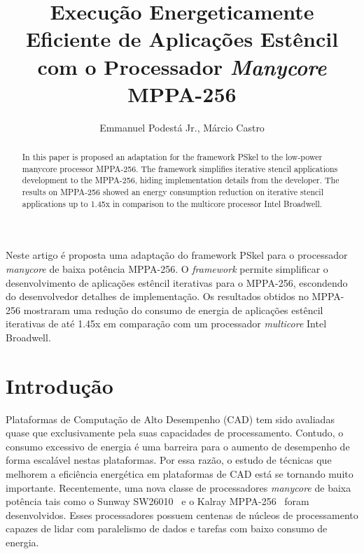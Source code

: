 \documentclass[12pt]{article}
\title{Execução Energeticamente Eficiente de Aplicações Estêncil com o Processador \textit{Manycore} MPPA-256}
\author{Emmanuel Podestá Jr.\inst{1}, Márcio Castro\inst{1}}
\newcommand{\fw}{\textit{framework}\xspace}
\newcommand{\mppa}{MPPA-256\xspace}
\begin{document}
\maketitle

\begin{abstract}
In this paper is proposed an adaptation for the framework PSkel to the low-power
manycore processor \mppa. The framework simplifies iterative stencil
applications development to the \mppa, hiding implementation details from the
developer. The results on \mppa showed an energy consumption reduction on
iterative stencil applications up to 1.45x in comparison to the multicore
processor Intel Broadwell.
\end{abstract}

\begin{resumo}
Neste artigo é proposta uma adaptação do framework PSkel para o processador
\textit{manycore} de baixa potência \mppa. O \fw permite simplificar o
desenvolvimento de aplicações estêncil iterativas para o \mppa, escondendo do
desenvolvedor detalhes de implementação. Os resultados obtidos no \mppa
mostraram uma redução do consumo de energia de aplicações estêncil iterativas de
até 1.45x em comparação com um processador \textit{multicore} Intel Broadwell.
\end{resumo}

\section{Introdução}

Plataformas de Computação de Alto Desempenho (CAD) tem sido avaliadas quase que
exclusivamente pela suas capacidades de processamento. Contudo, o consumo
excessivo de energia é uma barreira para o aumento de desempenho de forma
escalável nestas plataformas. Por essa razão, o estudo de técnicas que melhorem
a eficiência energética em plataformas de CAD está se tornando muito importante.
Recentemente, uma nova classe de processadores \textit{manycore} de baixa
potência tais como o Sunway SW26010~\cite{sunway:2016} e o Kalray
\mppa~\cite{Castro-IA3:2013} foram desenvolvidos. Esses processadores possuem
centenas de núcleos de processamento capazes de lidar com paralelismo de dados e
tarefas com baixo consumo de energia.
\end{document}
